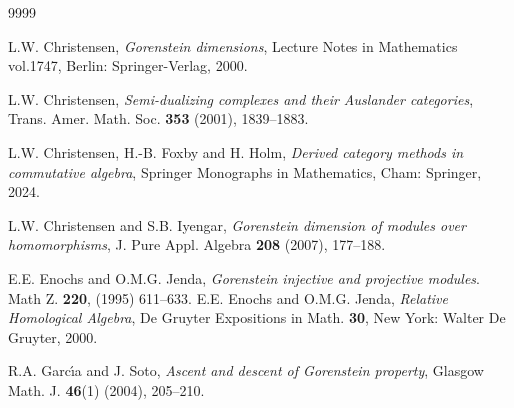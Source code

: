 \documentclass{amsart}
\newcommand{\0}{{\bf{0}}}
\theoremstyle{definition}
\begin{document}
\begin{thebibliography}{9999}



  L.W. Christensen, {\em Gorenstein dimensions}, Lecture Notes in Mathematics vol.1747, Berlin: Springer-Verlag, 2000.

  L.W. Christensen, {\em Semi-dualizing complexes and their Auslander categories}, Trans. Amer. Math. Soc. {\bf 353} (2001), 1839--1883.

L.W. Christensen, H.-B. Foxby and H. Holm, {\em Derived category methods in commutative algebra}, Springer Monographs in Mathematics, Cham: Springer, 2024.

  L.W. Christensen and S.B. Iyengar, {\em Gorenstein dimension of modules over homomorphisms}, J. Pure Appl. Algebra {\bf 208} (2007), 177--188.


 E.E. Enochs and  O.M.G. Jenda, {\em Gorenstein injective and projective modules}. Math Z. {\bf 220}, (1995) 611–633.
   E.E. Enochs and O.M.G. Jenda, {\em Relative Homological Algebra}, De Gruyter Expositions in Math. {\bf 30}, New York: Walter De Gruyter, 2000.




 R.A. Garc\'{\i}a and J. Soto, {\em Ascent and descent of Gorenstein property}, Glasgow Math. J. {\bf 46}(1) (2004), 205--210.






\end{thebibliography}
\end{document}
